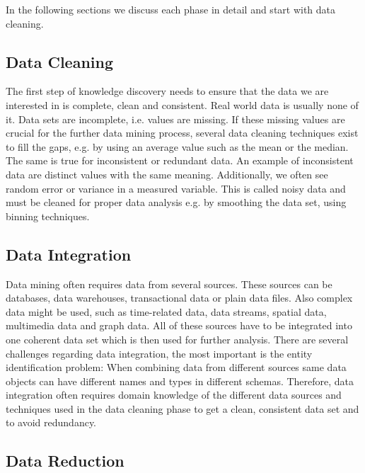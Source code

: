 In the following sections we discuss each phase in detail and start with data cleaning. 

\subsection{Data Cleaning} 
The first step of knowledge discovery needs to ensure that the data we are interested in is complete, clean and consistent. Real world data is usually none of it. Data sets are incomplete, i.e. values are missing. If these missing values are crucial for the further data mining process, several data cleaning techniques exist to fill the gaps, e.g. by using an average value such as the mean or the median.
\\
The same is true for inconsistent or redundant data. An example of inconsistent data are distinct values with the same meaning. Additionally, we often see random error or variance in a measured variable. This is called noisy data and must be cleaned for proper data analysis e.g. by smoothing the data set, using binning techniques.


\subsection{Data Integration}

Data mining often requires data from several sources. These sources can be databases, data warehouses, transactional data or plain data files. Also complex data might be used, such as time-related data, data streams, spatial data, multimedia data and graph data. All of these sources have to be integrated into one coherent data set which is then used for further analysis. There are several challenges regarding data integration, the most important is the entity identification problem: When combining data from different sources same data objects can have different names and types in different schemas. Therefore, data integration often requires domain knowledge of the different data sources and techniques used in the data cleaning phase to get a clean, consistent data set and to avoid redundancy.


\subsection{Data Reduction}

